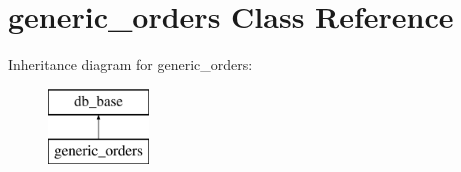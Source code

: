 \hypertarget{classgeneric__orders}{}\section{generic\+\_\+orders Class Reference}
\label{classgeneric__orders}
Inheritance diagram for generic\+\_\+orders\+:\begin{figure}[H]
\begin{center}
\leavevmode
\includegraphics[height=2.000000cm]{d3/d2b/classgeneric__orders}
\end{center}
\end{figure}
